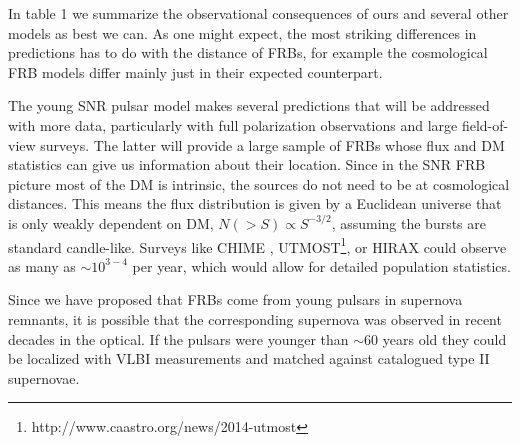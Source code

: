 \documentclass[useAMS,usenatbib]{mn2e}
\begin{document}
In table 1 we summarize the observational consequences
of ours and several other models as best we can. As one might expect,
the most striking differences in predictions has to do with the distance of FRBs,
for example the cosmological FRB models differ mainly just in their expected 
counterpart. 

The young SNR pulsar model makes several predictions that will
be addressed with more data, particularly with full polarization 
observations and large field-of-view surveys. 
The latter will provide a large sample of FRBs whose flux and DM statistics
 can give us information about their location. Since in the SNR FRB picture
most of the DM is intrinsic, the sources do not need to be at cosmological 
distances. This means the flux distribution is given by a Euclidean universe
that is only weakly dependent on DM, $N(>S) \propto S^{-3/2}$, assuming
the bursts are standard candle-like.
Surveys
like CHIME \citep{2014SPIE.9145E..22B}, 
UTMOST\footnote{http://www.caastro.org/news/2014-utmost},
 or HIRAX could observe as many as $\sim10^{3-4}$
per year, which would allow for detailed population statistics.

Since we have proposed that FRBs come from young pulsars 
in supernova remnants, it is possible that the corresponding 
supernova was observed in recent decades in the optical. If the pulsars
were younger than $\sim$60 years old they could be localized with VLBI
measurements and matched against catalogued type II supernovae. 
\end{document}
